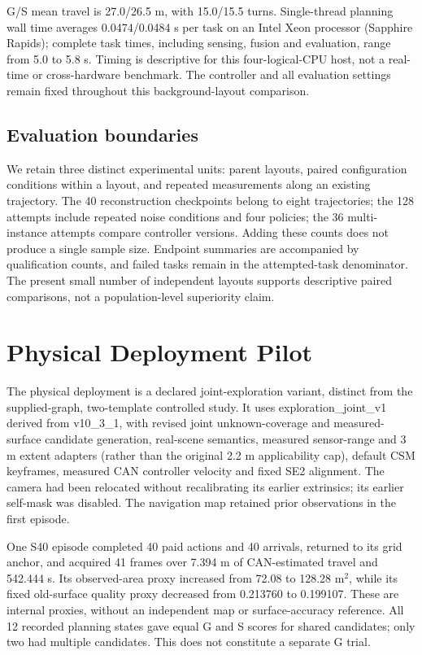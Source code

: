 \documentclass[11pt,a4paper]{article}
\providecommand{\hypertarget}[2]{#2}
\begin{document}
G/S mean travel is 27.0/26.5 m, with 15.0/15.5 turns. Single-thread planning wall time averages 0.0474/0.0484 s per task on an Intel Xeon processor (Sapphire Rapids); complete task times, including sensing, fusion and evaluation, range from 5.0 to 5.8 s. Timing is descriptive for this four-logical-CPU host, not a real-time or cross-hardware benchmark. The controller and all evaluation settings remain fixed throughout this background-layout comparison.

\hypertarget{evaluation-boundaries}{%
\subsection{Evaluation boundaries}\label{evaluation-boundaries}}

We retain three distinct experimental units: parent layouts, paired configuration conditions within a layout, and repeated measurements along an existing trajectory. The 40 reconstruction checkpoints belong to eight trajectories; the 128 attempts include repeated noise conditions and four policies; the 36 multi-instance attempts compare controller versions. Adding these counts does not produce a single sample size. Endpoint summaries are accompanied by qualification counts, and failed tasks remain in the attempted-task denominator. The present small number of independent layouts supports descriptive paired comparisons, not a population-level superiority claim.


\section{Physical Deployment Pilot}
The physical deployment is a declared joint-exploration variant, distinct from the supplied-graph, two-template controlled study. It uses exploration\_joint\_v1 derived from v10\_3\_1, with revised joint unknown-coverage and measured-surface candidate generation, real-scene semantics, measured sensor-range and 3 m extent adapters (rather than the original 2.2 m applicability cap), default CSM keyframes, measured CAN controller velocity and fixed SE2 alignment. The camera had been relocated without recalibrating its earlier extrinsics; its earlier self-mask was disabled. The navigation map retained prior observations in the first episode.

One S40 episode completed 40 paid actions and 40 arrivals, returned to its grid anchor, and acquired 41 frames over 7.394 m of CAN-estimated travel and 542.444 s. Its observed-area proxy increased from 72.08 to 128.28 m$^2$, while its fixed old-surface quality proxy decreased from 0.213760 to 0.199107. These are internal proxies, without an independent map or surface-accuracy reference. All 12 recorded planning states gave equal G and S scores for shared candidates; only two had multiple candidates. This does not constitute a separate G trial.
\end{document}
